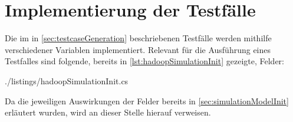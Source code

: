\section{Implementierung der Testfälle}
\label{sec:implTestcases}


Die im in \autoref{sec:testcaseGeneration} beschriebenen Testfälle werden mithilfe verschiedener Variablen implementiert.
Relevant für die Ausführung eines Testfalles sind folgende, bereits in \autoref{lst:hadoopSimulationInit} gezeigte, Felder:


{./listings/hadoopSimulationInit.cs}

Da die jeweiligen Auswirkungen der Felder bereits in \autoref{sec:simulationModelInit} erläutert wurden, wird an dieser Stelle hierauf verweisen.
